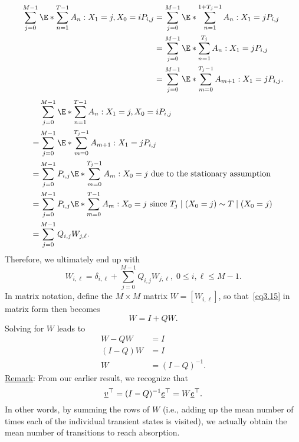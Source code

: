 \begin{Regular}
    \begin{align*}
        \sum_{j=0}^{M-1} \E*{\sum_{n=1}^{T-1} A_{n} \given X_{1}=j, X_{0}=i} P_{i, j}
         & =\sum_{j=0}^{M-1} \E*{\sum_{n=1}^{1+T_{j}-1} A_{n} \given X_{1}=j} P_{i, j} \\
         & =\sum_{j=0}^{M-1} \E*{\sum_{n=1}^{T_{j}} A_{n} \given X_{1}=j} P_{i, j}     \\
         & =\sum_{j=0}^{M-1} \E*{\sum_{m=0}^{T_{j}-1} A_{m+1}\given X_{1}=j} P_{i, j}.
    \end{align*}
    \begin{align*}
          & \sum_{j=0}^{M-1} \E*{\sum_{n=1}^{T-1} A_{n} \given X_{1}=j, X_{0}=i} P_{i, j}                                              \\
        = & \sum_{j=0}^{M-1} \E*{\sum_{m=0}^{T_{j}-1} A_{m+1}\given X_{1}=j} P_{i, j}                                                  \\
        = & \sum_{j=0}^{M-1} P_{i, j} \E*{\sum_{m=0}^{T_{j}-1} A_{m} \given X_{0}=j} \text{ due to the stationary assumption }         \\
        = & \sum_{j=0}^{M-1} P_{i, j} \E*{\sum_{m=0}^{T-1} A_{m} \given X_{0}=j} \text{ since } T_{j}\mid(X_{0}=j) \sim T\mid(X_{0}=j) \\
        = & \sum_{j=0}^{M-1} Q_{i, j} W_{j,\ell}.
    \end{align*}
    Therefore, we ultimately end up with
    \[ W_{i,\ell}=\delta_{i,\ell}+\sum_{j=0}^{M-1} Q_{i,j}W_{j,\ell},\;0\le i,\ell\le M-1.\label{eq3.15}\tag*{(3.15)} \]
    In matrix notation, define the $ M\times M $ matrix $ W=[W_{i,\ell}] $, so that~\ref{eq3.15} in matrix form then becomes
    \[ W=I+QW. \]
    Solving for $ W $ leads to
    \begin{align*}
        W-QW   & =I           \\
        (I-Q)W & =I           \\
        W      & =(I-Q)^{-1}.
    \end{align*}
    \tcblower{}
    \underline{Remark}: From our earlier result, we recognize that
    \[ \underline{v}^\top=(I-Q)^{-1}\underline{e}^\top=W \underline{e}^\top. \]
    In other words, by summing the rows of $W$ (i.e., adding up the mean number of times each of
    the individual transient states is visited), we actually obtain the mean number of transitions to
    reach absorption.
\end{Regular}
